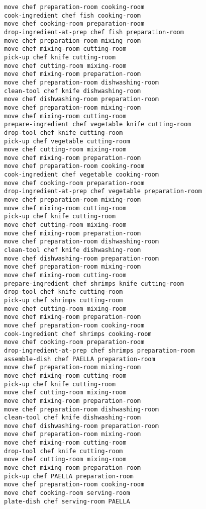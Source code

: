 \documentclass[a4paper,12pt]{article}
\begin{document}
\begin{lstlisting}[language=PDDL, caption=Plan for Problem 2]
move chef preparation-room cooking-room 
cook-ingredient chef fish cooking-room 
move chef cooking-room preparation-room 
drop-ingredient-at-prep chef fish preparation-room 
move chef preparation-room mixing-room 
move chef mixing-room cutting-room 
pick-up chef knife cutting-room 
move chef cutting-room mixing-room 
move chef mixing-room preparation-room 
move chef preparation-room dishwashing-room 
clean-tool chef knife dishwashing-room 
move chef dishwashing-room preparation-room 
move chef preparation-room mixing-room 
move chef mixing-room cutting-room 
prepare-ingredient chef vegetable knife cutting-room 
drop-tool chef knife cutting-room 
pick-up chef vegetable cutting-room 
move chef cutting-room mixing-room 
move chef mixing-room preparation-room 
move chef preparation-room cooking-room 
cook-ingredient chef vegetable cooking-room 
move chef cooking-room preparation-room 
drop-ingredient-at-prep chef vegetable preparation-room 
move chef preparation-room mixing-room 
move chef mixing-room cutting-room 
pick-up chef knife cutting-room 
move chef cutting-room mixing-room 
move chef mixing-room preparation-room 
move chef preparation-room dishwashing-room 
clean-tool chef knife dishwashing-room 
move chef dishwashing-room preparation-room 
move chef preparation-room mixing-room 
move chef mixing-room cutting-room 
prepare-ingredient chef shrimps knife cutting-room 
drop-tool chef knife cutting-room 
pick-up chef shrimps cutting-room 
move chef cutting-room mixing-room 
move chef mixing-room preparation-room 
move chef preparation-room cooking-room 
cook-ingredient chef shrimps cooking-room 
move chef cooking-room preparation-room 
drop-ingredient-at-prep chef shrimps preparation-room 
assemble-dish chef PAELLA preparation-room 
move chef preparation-room mixing-room 
move chef mixing-room cutting-room 
pick-up chef knife cutting-room 
move chef cutting-room mixing-room 
move chef mixing-room preparation-room 
move chef preparation-room dishwashing-room 
clean-tool chef knife dishwashing-room 
move chef dishwashing-room preparation-room 
move chef preparation-room mixing-room 
move chef mixing-room cutting-room 
drop-tool chef knife cutting-room 
move chef cutting-room mixing-room 
move chef mixing-room preparation-room 
pick-up chef PAELLA preparation-room 
move chef preparation-room cooking-room 
move chef cooking-room serving-room 
plate-dish chef serving-room PAELLA 
\end{lstlisting}
\end{document}
